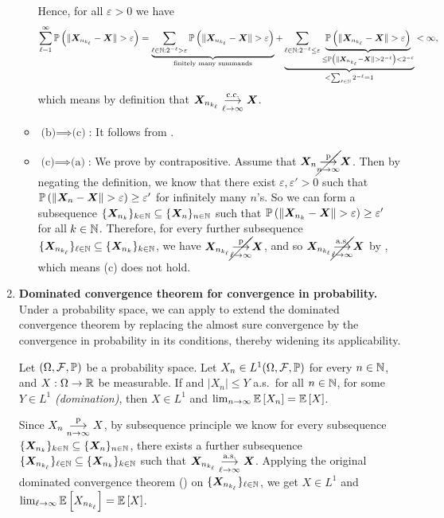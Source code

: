 \begin{enumerate}
\begin{pf}
\begin{itemize}
Hence, for all \(\varepsilon>0\) we have
\[
\sum_{\ell=1}^{\infty}\prob{\|\vect{X}_{n_{k_{\ell}}}-\vect{X}\|>\varepsilon}
=\underbrace{\sum_{\ell\in\N:2^{-\ell}>\varepsilon}^{}
\prob{\|\vect{X}_{n_{k_{\ell}}}-\vect{X}\|>\varepsilon}}_{\text{finitely many summands}}
+\underbrace{\sum_{\ell\in\N:2^{-\ell}\le\varepsilon}^{}
\underbrace{\prob{\|\vect{X}_{n_{k_{\ell}}}-\vect{X}\|>\varepsilon}}_{
\le\prob{\|\vect{X}_{n_{k_{\ell}}}-\vect{X}\|>2^{-\ell}}<2^{-\ell}}}
_{<\sum_{\ell\in\N}^{}2^{-\ell}=1}
<\infty,
\]
which means by definition that
\(\bm{X}_{n_{k_{\ell}}}\underset{\ell\to\infty}{\overset{\text{c.c.}}{\longrightarrow}}\bm{X}\).  \item
\(\text{(b)}\implies \text{(c)}\): It follows from .
\item \(\text{(c)}\implies \text{(a)}\): We prove by contrapositive. Assume
that \(\bm{X}_n\cancel{\underset{n\to\infty}{\overset{\text{p}}{\longrightarrow}}}\bm{X}\). Then by negating the definition, we
know that there exist \(\varepsilon,\varepsilon'>0\) such that
\(\prob{\|\vect{X}_{n}-\vect{X}\|>\varepsilon}\ge\varepsilon'\) for infinitely
many \(n\)'s. So we can form a subsequence
\(\{\bm{X}_{n_{k}}\}_{k\in\mathbb{N}}\subseteq \{\bm{X}_n\}_{n\in\mathbb{N}}\) such that
\(\prob{\|\vect{X}_{n_{k}}-\vect{X}\|>\varepsilon}\ge\varepsilon'\) for all
\(k\in\mathbb{N}\). Therefore, for every further subsequence
\(\{\bm{X}_{n_{k_{\ell}}}\}_{\ell\in\mathbb{N}}
\subseteq\{\bm{X}_{n_{k}}\}_{k\in\mathbb{N}}\), we have
\(\bm{X}_{n_{k_{\ell}}}\cancel{\underset{\ell\to\infty}{\overset{\text{p}}{\longrightarrow}}}\bm{X}\), and so
\(\bm{X}_{n_{k_{\ell}}}\cancel{\underset{\ell\to\infty}{\overset{\text{a.s.}}{\longrightarrow}}}\bm{X}\) by
, which means (c) does not hold.
\end{itemize}
\end{pf}
\item \textbf{Dominated convergence theorem for convergence in probability.}
Under a probability space, we can apply  to
extend the dominated convergence theorem by replacing the almost sure
convergence by the convergence in probability in its conditions, thereby
widening its applicability.
\begin{corollary}
\label{cor:dct-ip-version}
Let \((\Omega,\mathcal{F},\mathbb{P})\) be a probability space.  Let \(X_n\in
L^{1}(\Omega,\mathcal{F},\mathbb{P})\) for every \(n\in\mathbb{N}\), and \(X:\Omega\to\mathbb{R}\) be
measurable.  If  and \(|X_n|\le Y\) a.s.\ for all \(n\in\mathbb{N}\), for
some \(Y\in L^{1}\) \emph{(domination)}, then \(X\in L^{1}\) and
\(\lim_{n\to\infty}\mathbb{E}\left[X_n\right]=\mathbb{E}\left[X\right]\).
\end{corollary}
\begin{pf}
Since \(X_n\underset{n\to\infty}{\overset{\text{p}}{\longrightarrow}} X\), by subsequence principle we know
for every subsequence \(\{\bm{X}_{n_{k}}\}_{k\in\mathbb{N}}\subseteq \{\bm{X}_n\}_{n\in\mathbb{N}}\),
there exists a further subsequence
\(\{\bm{X}_{n_{k_{\ell}}}\}_{\ell\in\mathbb{N}}\subseteq \{\bm{X}_{n_{k}}\}_{k\in\mathbb{N}}\)
such that \(\bm{X}_{n_{k_{\ell}}}\underset{\ell\to\infty}{\overset{\text{a.s.}}{\longrightarrow}}\bm{X}\).
Applying the original dominated convergence theorem ()
on \(\{\bm{X}_{n_{k_{\ell}}}\}_{\ell\in\mathbb{N}}\), we get \(X\in L^{1}\) and
\(\lim_{\ell\to\infty}\mathbb{E}\left[X_{n_{k_{\ell}}}\right]=\mathbb{E}\left[X\right]\).


\end{pf}
\end{enumerate}
